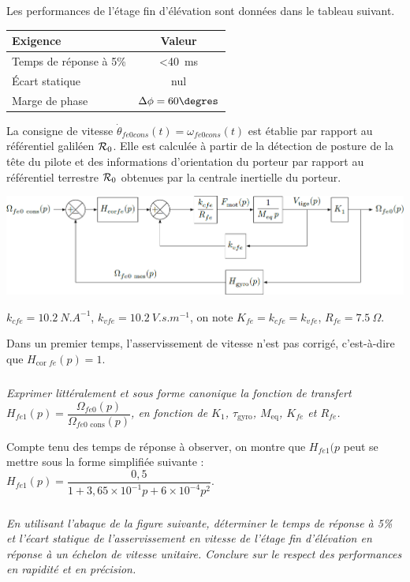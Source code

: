 \documentclass[10pt,fleqn]{article} %
\begin{document}
\begin{multicols}{2}
Les performances de l’étage fin d’élévation sont données dans le tableau suivant. 
\begin{center}
\begin{tabular}{|l|c|}
\hline
\textbf{Exigence} & Valeur \\ \hline
Temps de réponse à 5\% & <\SI{40}{ms} \\ \hline
Écart statique & nul \\ \hline
Marge de phase & $\Delta \phi = 60\degres$ \\ \hline
\end{tabular}
\end{center}

La consigne de vitesse $\dot{\theta}_{fe0 cons}(t)= \omega_{fe0 cons}(t)$ est établie par rapport au référentiel galiléen $\mathcal{R}_{0}$. Elle est calculée à partir de la détection de posture  de la tête du pilote et des informations 
d’orientation du porteur par rapport au référentiel terrestre $\mathcal{R}_{0}$ obtenues par la centrale inertielle du porteur.


\begin{center}
\includegraphics[width=\linewidth]{images/fig_02}

$k_{cfe}=\SI{10,2}{N.A^{-1}}$, $k_{vfe}=\SI{10,2}{V.s.m^{-1}}$, on note 
$K_{fe}=k_{cfe}=k_{vfe}$, $R_{fe}=\SI{7,5}{\Omega}$. 
\end{center}

Dans un premier temps, l’asservissement de vitesse n’est pas corrigé, c’est-à-dire que $H_{\text{cor }fe}(p)=1$.


\subparagraph{}\textit{Exprimer littéralement et sous forme canonique la fonction de transfert $H_{fe1}(p)=\dfrac{\Omega_{fe0}(p)}{\Omega_{fe0\text{ cons}}(p)}$, en fonction de $K_1$, $\tau_{\text{gyro}}$, $M_{\text{eq}}$, $K_{fe}$ et $R_{fe}$.}

\ifprof
\begin{corrige}
\end{corrige}
\else
\fi
Compte tenu des temps de réponse à observer, on montre que $H_{fe1}(p$ peut se mettre sous la forme simplifiée suivante : $H_{fe1}(p)=\dfrac{0,5}{1+3,65\times 10^{-1}p+6\times 10^{-4}p^2}$.
\subparagraph{}\textit{En utilisant l’abaque de la figure suivante, déterminer le temps de réponse à 5\% et l’écart statique de l’asservissement en vitesse de l’étage fin d’élévation en réponse à un échelon de vitesse unitaire. Conclure sur le
respect des performances en rapidité et en précision.}
\ifprof
\begin{corrige}
\end{corrige}
\else
\fi



\end{multicols}
\end{document}
